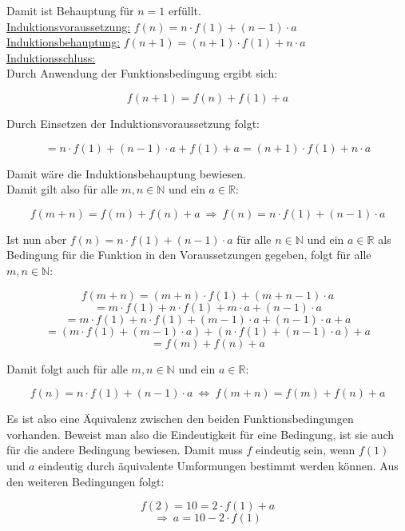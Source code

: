 \documentclass[11pt, a4paper]{article}
\begin{document}
		Damit ist Behauptung für $n=1$ erfüllt.\\



		\underline{Induktionsvoraussetzung:} $f(n) = n\cdot f(1) + (n-1)\cdot a$\\


		\underline{Induktionsbehauptung:} $f(n+1) = (n+1)\cdot f(1) + n\cdot a$ \\


		\underline{Induktionsschluss:}\\
		Durch Anwendung der Funktionsbedingung ergibt sich:

		\[ f(n+1) = f(n) + f(1) + a \]

		Durch Einsetzen der Induktionsvoraussetzung folgt:

		\[ = n\cdot f(1) + (n-1)\cdot a + f(1) + a = (n+1)\cdot f(1) + n\cdot a \]

		Damit wäre die Induktionsbehauptung bewiesen.\\


		Damit gilt also für alle $m,n \in \mathbb{N}$ und ein $a \in \mathbb{R}$:

		\[ f(m+n)= f(m) + f(n) + a \ \Rightarrow \ f(n) = n\cdot f(1) + (n-1)\cdot a \] 

		Ist nun aber $f(n) = n\cdot f(1) + (n-1)\cdot a$ für alle $n \in \mathbb{N}$ und ein $a \in \mathbb{R}$ als Bedingung für die Funktion in den Voraussetzungen gegeben, folgt für alle $m,n \in \mathbb{N}$:

		\[ f(m+n) = (m+n)\cdot f(1) + (m+n-1)\cdot a \]
		\[ = m\cdot f(1) + n\cdot f(1) + m\cdot a + (n-1)\cdot a \]
		\[ = m\cdot f(1) + n\cdot f(1) + (m-1)\cdot a + (n-1)\cdot a + a \]
		\[ = (m\cdot f(1) + (m-1)\cdot a) + (n\cdot f(1) + (n-1)\cdot a) + a \]
		\[ = f(m) + f(n) + a \]

		Damit folgt auch für alle $m,n \in \mathbb{N}$ und ein $a \in \mathbb{R}$:

		\[ f(n) = n\cdot f(1) + (n-1)\cdot a \ \Leftrightarrow \ f(m+n) = f(m) + f(n) + a \]

		Es ist also eine Äquivalenz zwischen den beiden Funktionsbedingungen vorhanden. Beweist man also die Eindeutigkeit für eine Bedingung, ist sie auch für die andere Bedingung bewiesen. Damit muss $f$ eindeutig sein, wenn $f(1)$ und $a$ eindeutig durch äquivalente Umformungen bestimmt werden können. Aus den weiteren Bedingungen folgt:

		\[ f(2) = 10 = 2\cdot f(1) + a \]
		\[ \Rightarrow \ a = 10 - 2\cdot f(1) \]
\end{document}
